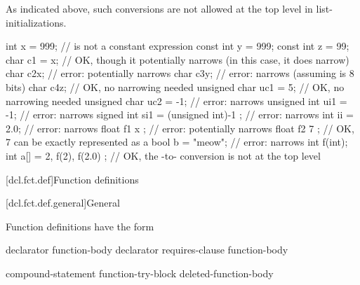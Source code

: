 \begin{note}
As indicated above, such conversions are not allowed at the top level in
list-initializations.
\end{note}
\begin{example}
\begin{codeblock}
int x = 999;                    //  is not a constant expression
const int y = 999;
const int z = 99;
char c1 = x;                    // OK, though it potentially narrows (in this case, it does narrow)
char c2{x};                     // error: potentially narrows
char c3{y};                     // error: narrows (assuming  is 8 bits)
char c4{z};                     // OK, no narrowing needed
unsigned char uc1 = {5};        // OK, no narrowing needed
unsigned char uc2 = {-1};       // error: narrows
unsigned int ui1 = {-1};        // error: narrows
signed int si1 =
  { (unsigned int)-1 };         // error: narrows
int ii = {2.0};                 // error: narrows
float f1 { x };                 // error: potentially narrows
float f2 { 7 };                 // OK, 7 can be exactly represented as a 
bool b = {"meow"};              // error: narrows
int f(int);
int a[] = { 2, f(2), f(2.0) };  // OK, the -to- conversion is not at the top level
\end{codeblock}
\end{example}
%
%

[dcl.fct.def]{Function definitions}%

[dcl.fct.def.general]{General}

\pnum
{}%
Function definitions have the form
%
%
\begin{bnf}
\br
      declarator  function-body\br
      declarator requires-clause function-body
\end{bnf}

\begin{bnf}
\br
     compound-statement\br
    function-try-block\br
    \terminal{=}  \terminal{;}\br
    deleted-function-body
\end{bnf}

